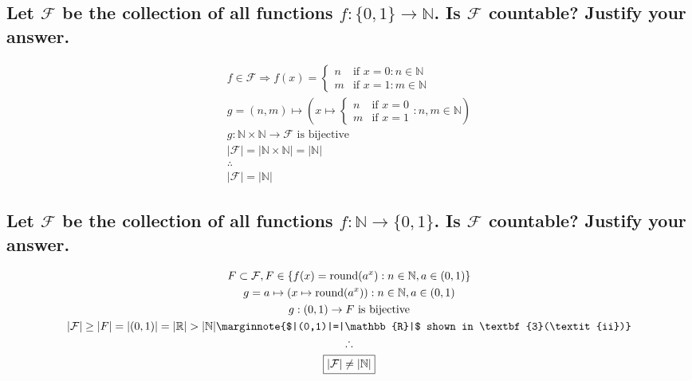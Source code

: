 \documentclass[letterpaper]{article}
\begin{document}
\subsection{Let $\mathcal{F}$ be the collection of all functions $f:\{0,1\}\rightarrow\mathbb{N}$. Is $\mathcal{F}$ countable? Justify your answer.}
\begin{gather*}
f\in\mathcal{F}\Rightarrow f(x)=\begin{cases}
n & \text{if } x=0:n\in\mathbb{N} \\
m & \text{if } x=1:m\in\mathbb{N}
\end{cases} \\
g=(n,m)\mapsto (x\mapsto\begin{cases}
n & \text{if } x=0 \\
m & \text{if } x=1
\end{cases}:n,m\in\mathbb{N}) \\
g:\mathbb{N}\times\mathbb{N}\rightarrow\mathcal{F}\text{ is bijective} \\
|\mathcal{F}|=|\mathbb{N}\times\mathbb{N}|=|\mathbb{N}| \\
\therefore \\
\boxed{|\mathcal{F}|=|\mathbb{N}|}
\end{gather*}
\subsection{Let $\mathcal{F}$ be the collection of all functions $f:\mathbb{N}\rightarrow\{0,1\}$. Is $\mathcal{F}$ countable? Justify your answer.}
\begin{gather*}
F\subset\mathcal{F},F\in \{f(x)=\text{round}(a^x): n\in\mathbb{N},a\in(0, 1)\} \\
g=a\mapsto(x\mapsto\text{round}(a^x)):n\in\mathbb{N},a\in(0, 1) \\
g:(0,1)\rightarrow F\text{ is bijective} \\
|\mathcal{F}|\geq|F|=|(0,1)|=|\mathbb{R}|>|\mathbb{N}| \marginnote{$|(0,1)|=|\mathbb{R}|$ shown in \textbf{3}(\textit{ii})} \\
\therefore \\
\boxed{|\mathcal{F}|\neq|\mathbb{N}|}
\end{gather*}
\end{document}
